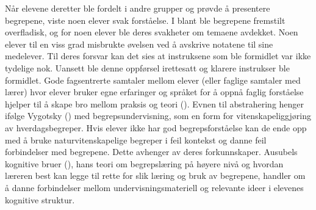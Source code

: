 \documentclass[main.tex]{subfiles}
\begin{document}
\newline
\newline
Når elevene deretter ble fordelt i andre grupper og prøvde å presentere begrepene, viste noen elever 
svak forståelse. I blant ble begrepene fremstilt overfladisk, og for noen elever ble deres svakheter 
om temaene avdekket. Noen elever til en viss grad misbrukte øvelsen ved å avskrive notatene til sine 
medelever. Til deres forsvar kan det sies at instruksene som ble formidlet var ikke tydelige nok. 
Uansett ble denne oppførsel irettesatt og klarere instrukser ble formidlet.
\newline
\newline
Gode fagsentrerte samtaler mellom elever (eller faglige samtaler med lærer) hvor elever bruker egne 
erfaringer og språket for å oppnå faglig forståelse hjelper til å skape bro mellom praksis og teori 
().
\newline
\newline
Evnen til abstrahering henger ifølge Vygotsky () med begrepsundervisning, som en
form for vitenskapeliggjøring av hverdagsbegreper. Hvis elever ikke har god begrepsforståelse
kan de ende opp med å bruke naturvitenskapelige begreper i feil kontekst og danne feil 
forbindelser med begrepene. Dette avhenger av deres forkunnskaper. Ausubels kognitive bruer 
(), hans teori om begrepslæring på høyere nivå og hvordan læreren best kan 
legge til rette for slik læring og bruk av begrepene, handler om å danne forbindelser mellom 
undervisningsmateriell og relevante ideer i elevenes kognitive struktur.
\end{document}
